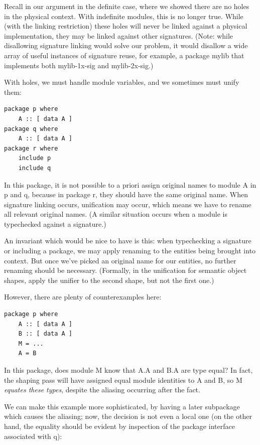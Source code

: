 \documentclass{article}
\begin{document}
Recall in our argument in the definite case, where we showed there are
no holes in the physical context.  With indefinite modules, this is no
longer true. While (with the linking restriction) these holes will never
be linked against a physical implementation, they may be linked against
other signatures.  (Note: while disallowing signature linking would
solve our problem, it would disallow a wide array of useful instances of
signature reuse, for example, a package mylib that implements both
mylib-1x-sig and mylib-2x-sig.)

With holes, we must handle module variables, and we sometimes must unify them:

\begin{verbatim}
package p where
    A :: [ data A ]
package q where
    A :: [ data A ]
package r where
    include p
    include q
\end{verbatim}

In this package, it is not possible to a priori assign original names to
module A in p and q, because in package r, they should have the same
original name.  When signature linking occurs, unification may occur,
which means we have to rename all relevant original names. (A similar
situation occurs when a module is typechecked against a signature.)

An invariant which would be nice to have is this: when typechecking a
signature or including a package, we may apply renaming to the entities
being brought into context.  But once we've picked an original name for
our entities, no further renaming should be necessary. (Formally, in the
unification for semantic object shapes, apply the unifier to the second
shape, but not the first one.)

However, there are plenty of counterexamples here:

\begin{verbatim}
package p where
    A :: [ data A ]
    B :: [ data A ]
    M = ...
    A = B
\end{verbatim}

In this package, does module M know that A.A and B.A are type equal?  In
fact, the shaping pass will have assigned equal module identities to A
and B, so M \emph{equates these types}, despite the aliasing occurring
after the fact.

We can make this example more sophisticated, by having a later
subpackage which causes the aliasing; now, the decision is not even a
local one (on the other hand, the equality should be evident by inspection
of the package interface associated with q):
\end{document}
